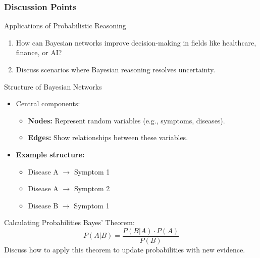 \documentclass[aspectratio=169]{beamer}
\begin{document}
\begin{frame}[fragile]
  \frametitle{Discussion Points}
  \begin{block}{Applications of Probabilistic Reasoning}
    \begin{enumerate}
      \item How can Bayesian networks improve decision-making in fields like healthcare, finance, or AI?
      \item Discuss scenarios where Bayesian reasoning resolves uncertainty.
    \end{enumerate}
  \end{block}
  
  \begin{block}{Structure of Bayesian Networks}
    \begin{itemize}
      \item Central components: 
      \begin{itemize}
        \item \textbf{Nodes:} Represent random variables (e.g., symptoms, diseases).
        \item \textbf{Edges:} Show relationships between these variables.
      \end{itemize}
      \item \textbf{Example structure:}
        \begin{itemize}
          \item Disease A $\rightarrow$ Symptom 1
          \item Disease A $\rightarrow$ Symptom 2
          \item Disease B $\rightarrow$ Symptom 1
        \end{itemize}
    \end{itemize}
  \end{block}
  
  \begin{block}{Calculating Probabilities}
    Bayes' Theorem:
    \begin{equation}
    P(A|B) = \frac{P(B|A) \cdot P(A)}{P(B)}
    \end{equation}
    Discuss how to apply this theorem to update probabilities with new evidence.
  \end{block}
\end{frame}
\end{document}

